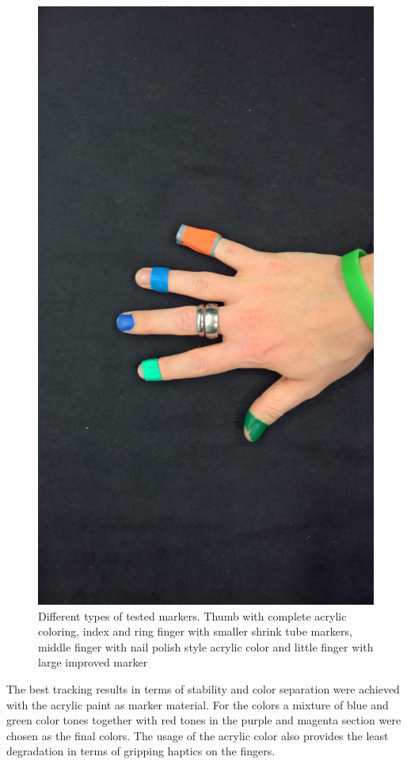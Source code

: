 \begin{figure}[H]
\centering
\includegraphics[width=\textwidth/2]{images/different_markers.jpg}
\caption{Different types of tested markers. Thumb with complete acrylic coloring, index and ring finger with smaller shrink tube markers, middle finger with nail polish style acrylic color and little finger with large improved marker}
\label{img:differnt_markers}
\end{figure}
The best tracking results in terms of stability and color separation were achieved with the acrylic paint as marker material. For the colors a mixture of blue and green color tones together with red tones in the purple and magenta section were chosen as the final colors. The usage of the acrylic color also provides the least degradation in terms of gripping haptics on the fingers.
